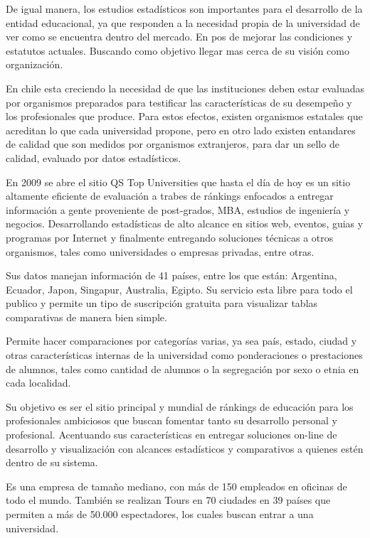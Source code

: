 \documentclass[a4paper,12pt,openany,oneside]{book}
\begin{document}
De igual manera, los estudios estadísticos son importantes para el desarrollo de la entidad educacional, ya que responden a la necesidad propia de la universidad de ver como se encuentra dentro del mercado. En pos de mejorar las condiciones y estatutos actuales. Buscando como objetivo llegar mas cerca de su visión como organización.

En chile esta creciendo la necesidad de que las instituciones deben estar evaluadas por organismos preparados para testificar las características de su desempeño y los profesionales que produce. Para estos efectos, existen organismos estatales que acreditan lo que cada universidad propone, pero en otro lado existen entandares de calidad que son medidos por organismos extranjeros, para dar un sello de calidad, evaluado por datos estadísticos\cite{data1}.

En 2009 se abre el sitio QS Top Universities que hasta el día de hoy es un sitio altamente eficiente de evaluación a trabes de ránkings enfocados a entregar información a gente proveniente de post-grados, MBA, estudios de ingeniería y negocios. Desarrollando estadísticas de alto alcance en sitios web, eventos, guias y programas por Internet y finalmente entregando soluciones técnicas a otros organismos, tales como universidades o empresas privadas, entre otras.

Sus datos manejan información de 41 países, entre los que están: Argentina, Ecuador, Japon, Singapur, Australia, Egipto. Su servicio esta libre para todo el publico y permite un tipo de suscripción gratuita para visualizar tablas comparativas de manera bien simple.

Permite hacer comparaciones por categorías varias, ya sea país, estado, ciudad y otras características internas de la universidad como ponderaciones o prestaciones de alumnos, tales como cantidad de alumnos o la segregación por sexo o etnia en cada localidad.

Su objetivo es ser el sitio principal y mundial de ránkings de educación para los profesionales ambiciosos que buscan fomentar tanto su desarrollo personal y profesional. Acentuando sus características en entregar soluciones on-line de desarrollo y visualización con alcances estadísticos y comparativos a quienes estén dentro de su sistema.

Es una empresa de tamaño mediano, con más de 150 empleados en oficinas de todo el mundo. También se realizan Tours en 70 ciudades en 39 países que permiten a más de 50.000 espectadores, los cuales buscan entrar a una universidad\cite{data2}.
\end{document}
